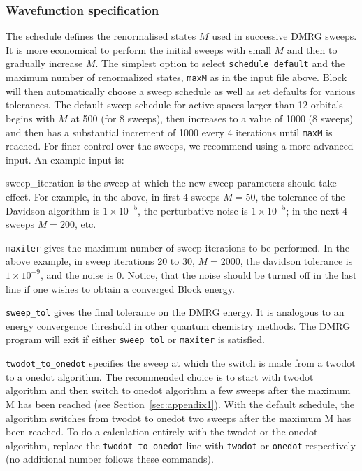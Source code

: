 \documentclass[letterpaper,12pt,aps, pra]{revtex4-1}
\begin{document}
\subsubsection{Wavefunction specification}\label{sec:AppSched}
The schedule defines the renormalised states $M$ used in successive DMRG
sweeps. It is more economical to perform the initial sweeps with small $M$ and
then to gradually increase $M$. The simplest option to select \texttt{schedule
default} and the maximum number of renormalized states, \texttt{maxM} as in the
input file above. Block will then automatically choose a sweep schedule as well
as set defaults for various tolerances.  The default sweep schedule for active
spaces larger than 12 orbitals begins with $M$ at 500 (for 8 sweeps), then increases
to a value of 1000 (8 sweeps) and then has a substantial increment of 1000
every 4 iterations until \texttt{maxM} is reached. For finer
control over the sweeps, we recommend using a more advanced input. An example
input is:

sweep\_iteration is the sweep at which the new sweep parameters should take
effect. For example, in the above, in  first 4 sweeps $M=50$, the tolerance of
the Davidson algorithm is $1\times 10^{-5}$, the perturbative  noise is $1
\times 10^{-5}$; in the next 4 sweeps $M=200$, etc.

\texttt{maxiter} gives the maximum number of sweep iterations to be performed.
In the above example, in sweep iterations 20 to 30, $M=2000$, the davidson
tolerance is $1\times 10^{-9}$, and the noise is 0. Notice, that the noise
should be turned off in the last line if one wishes to obtain a converged Block
energy.

\texttt{sweep\_tol} gives the final tolerance on the DMRG energy. It is
analogous to an energy convergence threshold in other quantum chemistry
methods.  The DMRG program will exit if either \texttt{sweep\_tol} or
\texttt{maxiter} is satisfied.

\texttt{twodot\_to\_onedot} specifies the sweep at which the switch is made
from a twodot to a onedot algorithm. The recommended choice is to start with
twodot algorithm and then switch to onedot algorithm a few sweeps after the
maximum M has been reached (see Section~\ref{sec:appendix1}).  With the default
schedule, the algorithm switches from twodot to onedot two sweeps after the
maximum M has been reached.  To do a calculation entirely with the twodot or
the onedot algorithm, replace the \texttt{twodot\_to\_onedot} line with
\texttt{twodot} or \texttt{onedot} respectively (no additional number follows
these commands). 
\end{document}
